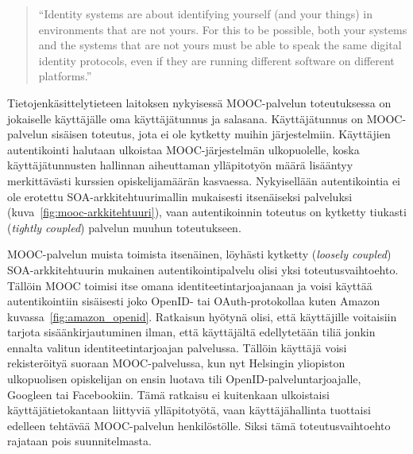 \documentclass[finnish,gradu]{tktltiki}
\begin{document}
  \begin{quote}
    ``Identity systems are about identifying yourself (and your things) in environments that are not yours.
    For this to be possible, both your systems and the systems that are not yours
    must be able to speak the same digital identity protocols,
    even if they are running different software on different platforms.''~\cite{cameron_id_arch_2006}
  \end{quote}

  Tietojenkäsittelytieteen laitoksen nykyisessä MOOC-palvelun toteutuksessa on jokaiselle käyttäjälle oma käyttäjätunnus ja salasana. Käyttäjätunnus on MOOC-palvelun sisäisen toteutus, jota ei ole kytketty muihin järjestelmiin. Käyttäjien autentikointi halutaan ulkoistaa MOOC-järjestelmän ulkopuolelle, koska käyttäjätunnusten hallinnan aiheuttaman ylläpitotyön määrä lisääntyy merkittävästi kurssien opiskelijamäärän kasvaessa. Nykyisellään autentikointia ei ole erotettu SOA-arkkitehtuurimallin mukaisesti itsenäiseksi palveluksi (kuva~\ref{fig:mooc-arkkitehtuuri}), vaan autentikoinnin toteutus on kytketty tiukasti (\emph{tightly coupled}) palvelun muuhun toteutukseen.

  MOOC-palvelun muista toimista itsenäinen, löyhästi kytketty (\emph{loosely coupled}) SOA-arkkitehtuurin mukainen autentikointipalvelu olisi yksi toteutusvaihtoehto. Tällöin MOOC toimisi itse omana identiteetintarjoajanaan ja voisi käyttää autentikointiin sisäisesti joko OpenID- tai OAuth-protokollaa kuten Amazon kuvassa~\ref{fig:amazon_openid}. Ratkaisun hyötynä olisi, että käyttäjille voitaisiin tarjota sisäänkirjautuminen ilman, että käyttäjältä edellytetään tiliä jonkin ennalta valitun identiteetintarjoajan palvelussa. Tällöin käyttäjä voisi rekisteröityä suoraan MOOC-palvelussa, kun nyt Helsingin yliopiston ulkopuolisen opiskelijan on ensin luotava tili OpenID-palveluntarjoajalle, Googleen tai Facebookiin. Tämä ratkaisu ei kuitenkaan ulkoistaisi käyttäjätietokantaan liittyviä ylläpitotyötä, vaan käyttäjähallinta tuottaisi edelleen tehtävää MOOC-palvelun henkilöstölle. Siksi tämä toteutusvaihtoehto rajataan pois suunnitelmasta.
\end{document}
